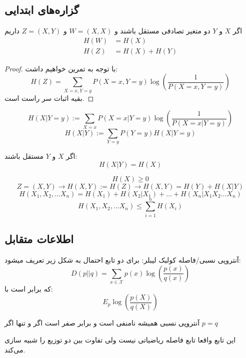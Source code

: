 \subsection{گزاره‌های ابتدایی}
\begin{theorem}
اگر
$X$
و
$Y$
دو متغیر تصادفی مستقل باشند و
$W = (X, X)$
و
$Z = (X, Y)$
داریم
\begin{align*}
    H(W) &= H(X) \\
    H(Z) &= H(X) + H(Y)
\end{align*}
\end{theorem}
\begin{proof}
	با توجه به تمرین خواهیم داشت:
$$H(Z) = \sum_{X = x, Y = y} P(X = x, Y = y) \log(\frac{1}{ P(X = x, Y = y)})$$
بقیه اثبات سر راست است.
\end{proof}
\begin{definition}
$$H(X | Y = y) := \sum_{X = x} P(X = x| Y = y) \log(\frac{1}{P(X = x| Y = y)})$$
$$H(X|Y) := \sum_{Y = y} P(Y = y) H(X | Y = y)$$
\end{definition}

\begin{theorem}
اگر
$X$
و
$Y$
مستقل باشند:
$$H(X|Y) = H(X)$$
\end{theorem}
\begin{theorem}
$$H(X) \geq 0$$
$$Z = (X, Y) \rightarrow H(X, Y) := H(Z) \rightarrow H(X, Y) = H(Y) + H(X|Y) $$
$$H(X_1, X_2, \dots X_n) = H(X_1) + H(X_2 | X_1) + \dots + H(X_n | X_1 X_2 \dots X_n)$$
$$H(X_1, X_2, \dots X_n) \leq \sum_{i = 1}^{n} H(X_i)$$
\end{theorem}
\subsection{اطلاعات متقابل}
\begin{definition}
آنتروپی نسبی/فاصله کولبک لیبلر: برای دو تابع احتمال به شکل زیر تعریف میشود:
$$
D(p||q) = \sum_{x \in \mathcal{X}} p(x) \log(\dfrac{p(x)}{q(x)})
$$
که برابر است با:
$$E_p \log(\dfrac{p(X)}{q(X)})$$
\end{definition}
\begin{theorem}
آنتروپی نسبی همیشه نامنفی است و برابر صفر است اگر و تنها اگر
$p = q$
\end{theorem}
این تابع واقعا تابع فاصله ریاضیاتی نیست ولی تفاوت بین دو توزیع را شبیه سازی می‌کند.

